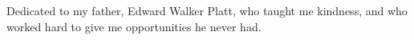 Dedicated to my father, Edward Walker Platt,
who taught me kindness,
and who worked hard to give me opportunities he never had.
